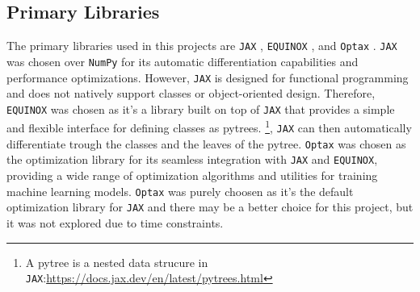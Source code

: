 \subsection{Primary Libraries}
The primary libraries used in this projects are \texttt{JAX} \cite{jax2018github}, \texttt{EQUINOX} \cite{kidger2021equinox}, and \texttt{Optax} \cite{optax2020github}. \newline
\texttt{JAX} was chosen over \texttt{NumPy} for its automatic differentiation capabilities and performance optimizations. However, \texttt{JAX} is designed for functional programming and does not natively support classes or object-oriented design.
Therefore, \texttt{EQUINOX} was chosen as it's a library built on top of \texttt{JAX} 
that provides a simple and flexible interface for defining classes as pytrees. \footnote{A pytree is a nested data strucure in \texttt{JAX}:\url{https://docs.jax.dev/en/latest/pytrees.html} }, 
\texttt{JAX} can then automatically differentiate trough the classes and the leaves of the pytree. \newline
\texttt{Optax} was chosen as the optimization library for its seamless integration with \texttt{JAX} and \texttt{EQUINOX}, providing a wide range
of optimization algorithms and utilities for training machine learning models. \texttt{Optax} was purely
choosen as it's the default optimization library for \texttt{JAX} and there may be a better choice for this project, but it was not explored due to time constraints. \newline